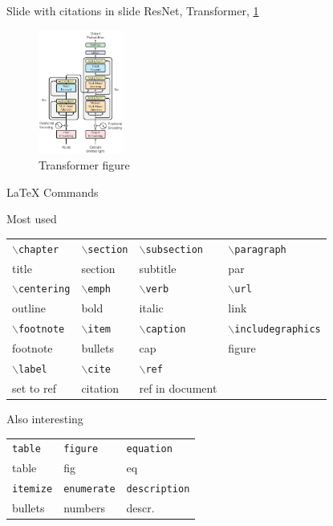 \documentclass{beamer}
\def\cmd#1{\texttt{\color{red}\footnotesize $\backslash$#1}}
\def\env#1{\texttt{\color{blue}\footnotesize #1}}
\begin{document}
\begin{frame}{Slide with citations in slide}
    ResNet, Transformer,
    \ref{fig:transformer-arc}
    \begin{figure}[htbp]
        \centering
        \includegraphics[width=0.25\textwidth]{fig/transformer_arch.png}
        \caption{Transformer figure}
        \label{fig:transformer-arc}
    \end{figure}
\end{frame}

\begin{frame}[fragile]{\LaTeX{} Commands}
    \begin{exampleblock}{Most used}
        \centering
        \footnotesize
        \begin{tabular}{llll}
            \cmd{chapter} & \cmd{section} & \cmd{subsection} & \cmd{paragraph} \\
            title & section & subtitle & par \\\hline
            \cmd{centering} & \cmd{emph} & \cmd{verb} & \cmd{url} \\
            outline & bold & italic & link \\\hline
            \cmd{footnote} & \cmd{item} & \cmd{caption} & \cmd{includegraphics} \\
            footnote & bullets & cap & figure \\\hline
            \cmd{label} & \cmd{cite} & \cmd{ref} \\
            set to ref & citation & ref in document\\\hline
        \end{tabular}
    \end{exampleblock}
    \begin{exampleblock}{Also interesting}
        \centering
        \footnotesize
        \begin{tabular}{lll}
            \env{table} & \env{figure} & \env{equation}\\
            table & fig & eq \\\hline
            \env{itemize} & \env{enumerate} & \env{description}\\
            bullets & numbers & descr. \\\hline
        \end{tabular}
    \end{exampleblock}
\end{frame}
\end{document}
